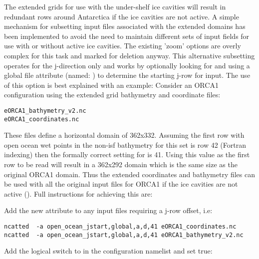 \documentclass[NEMO_book]{subfiles}
\begin{document}
The extended grids for use with the under-shelf ice cavities will result in redundant rows
around Antarctica if the ice cavities are not active. A simple mechanism for subsetting
input files associated with the extended domains has been implemented to avoid the need to
maintain different sets of input fields for use with or without active ice cavities. The
existing 'zoom' options are overly complex for this task and marked for deletion anyway.
This alternative subsetting operates for the j-direction only and works by optionally
looking for and using a global file attribute (named: ) to
determine the starting j-row for input. The use of this option is best explained with an
example: Consider an ORCA1 configuration using the extended grid bathymetry and coordinate
files:
\vspace{-10pt}
\begin{alltt}
\tiny
\begin{verbatim}
eORCA1_bathymetry_v2.nc
eORCA1_coordinates.nc
\end{verbatim}
\end{alltt}
\noindent These files define a horizontal domain of 362x332. Assuming the first row with
open ocean wet points in the non-isf bathymetry for this set is row 42 (Fortran indexing)
then the formally correct setting for  is 41. Using this value as the
first row to be read will result in a 362x292 domain which is the same size as the original
ORCA1 domain. Thus the extended coordinates and bathymetry files can be used with all the
original input files for ORCA1 if the ice cavities are not active (). Full instructions for achieving this are:

\noindent Add the new attribute to any input files requiring a j-row offset, i.e:
\vspace{-10pt}
\begin{alltt}
\tiny
\begin{verbatim}
ncatted  -a open_ocean_jstart,global,a,d,41 eORCA1_coordinates.nc 
ncatted  -a open_ocean_jstart,global,a,d,41 eORCA1_bathymetry_v2.nc
\end{verbatim}
\end{alltt}
 
\noindent Add the logical switch to  in the configuration namelist and set true:
\end{document}
